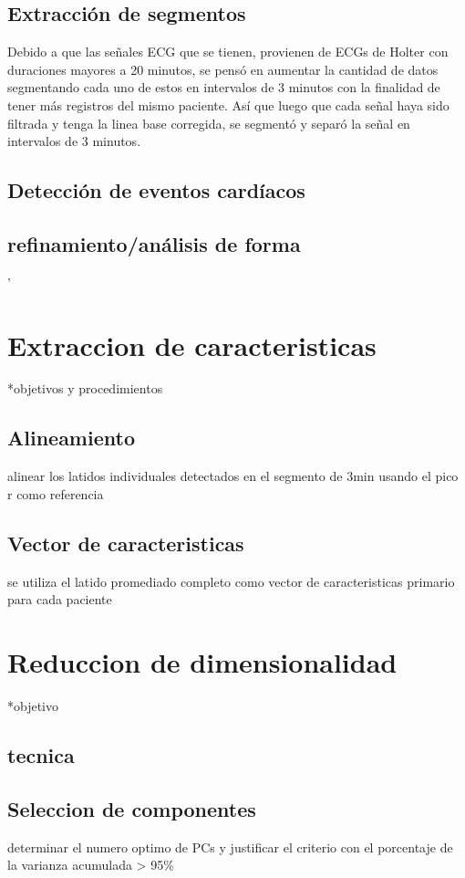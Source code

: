\documentclass[12pt,letterpaper,oneside,openright]{book}
\begin{document}
\subsection{Extracción de segmentos}

Debido a que las señales ECG que se tienen, provienen de ECGs de Holter con duraciones mayores a 20 minutos, se pensó en aumentar la cantidad de datos segmentando cada uno de estos en intervalos de 3 minutos con la finalidad de tener más registros del mismo paciente. Así que luego que cada señal haya sido filtrada y tenga la linea base corregida, se segmentó y separó la señal en intervalos de 3 minutos.


\subsection{Detección de eventos cardíacos}


\subsection{refinamiento/análisis de forma}'


\section{Extraccion de caracteristicas}
*objetivos y procedimientos
\subsection{Alineamiento} alinear los latidos individuales detectados en el segmento de 3min usando el pico r como referencia
\subsection{Vector de caracteristicas} se utiliza el latido promediado completo como vector de caracteristicas primario para cada paciente


\section{Reduccion de dimensionalidad}
*objetivo
\subsection{tecnica}
\subsection{Seleccion de componentes} determinar el numero optimo de PCs y justificar el criterio con el porcentaje de la varianza acumulada > 95\%
\end{document}
